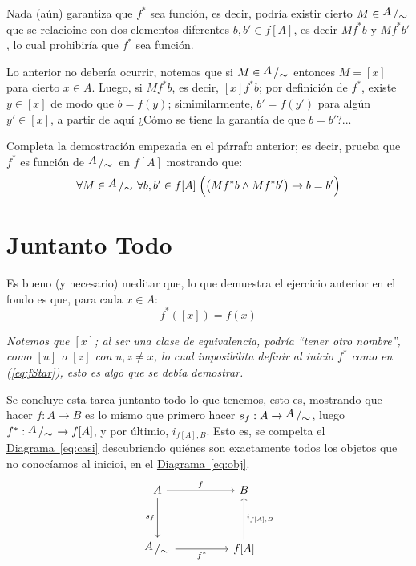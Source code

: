 \documentclass[letterpaper,DIV=14,headsepline,12pt]{scrartcl}
\newcommand{\pts}{}
\newenvironment{ejercicio}[1]{\ifthenelse{\equal{#1}{1} \OR \equal{#1}{+1}}{\renewcommand{\pts}{\textbf{(#1 pt)}}}{\renewcommand{\pts}{\textbf{(#1 pts)}}}\begin{ejj}\upshape \pts}{\end{ejj}}
\newcommand{\quot}[2]{{\raisebox{.2em}{$#1$}\left/\raisebox{-.2em}{$#2$}\right.}}
\begin{document}
    Nada (aún) garantiza que $f^*$ sea función, es decir, podría existir cierto $M \in \quot{A}{\sim}$ que se relacioine con dos elementos diferentes $b,b' \in f[A]$, es decir $M f^* b$ y $M f^* b'$, lo cual prohibiría que $f^*$ sea función.
    
    Lo anterior no debería ocurrir, notemos que si $M \in \quot{A}{\sim}$ entonces $M=[x]$ para cierto $x \in A$. Luego, si $M f^* b$, es decir, $[x] f^* b$; por definición de $f^*$, existe $y \in [x]$ de modo que $b=f(y)$; simimilarmente, $b'=f(y')$ para algún $y'\in[x]$, a partir de aquí ¿Cómo se tiene la garantía de que $b=b'$?...

    \begin{ejercicio}{1.5}\label{ej:fStar}
        Completa la demostración empezada en el párrafo anterior; es decir, prueba que $f^*$ es función de $\quot{A}{\sim}$ en $f[A]$ mostrando que:
        \[ \forall M \in \quot{A}{\sim} \; \forall b,b' \in f[A] \; \Big( \big( M f^* b \land M f^* b' \big) \to b=b' \Big) \]
    \end{ejercicio}

    \section*{Juntanto Todo}

    Es bueno (y necesario) meditar que, lo que demuestra el ejercicio anterior en el fondo es que, para cada $x \in A$:
    \begin{equation}\label{eq:fStar}
        f^*([x])=f(x)
    \end{equation}

    \textit{Notemos que $[x]$; al ser una clase de equivalencia, podría ``tener otro nombre'', como $[u]$ o $[z]$ con $u,z \neq x$, lo cual imposibilita definir al inicio $f^*$ como en (\ref{eq:fStar}), esto es algo que se debía demostrar.}

    Se concluye esta tarea juntanto todo lo que tenemos, esto es, mostrando que hacer $f:A\to B$ es lo mismo que primero hacer $s_f:A\to \quot{A}{\sim}$, luego $f^*:\quot{A}{\sim} \to f[A]$, y por últimio, $i_{f[A],B}$. Esto es, se compelta el \hyperref[eq:obj]{Diagrama~\ref*{eq:casi}} descubriendo quiénes son exactamente todos los objetos que no conocíamos al inicioi, en el \hyperref[eq:obj]{Diagrama~\ref*{eq:obj}}.
    \begin{equation}\label{eq:ya}
        \begin{tikzcd}
            A && B \\
            \\
            \quot{A}{\sim} && {f[A]}
            \arrow["f", from=1-1, to=1-3]
            \arrow["s_f"', from=1-1, to=3-1]
            \arrow["f^*"', from=3-1, to=3-3]
            \arrow["{i_{f[A],B}}"', from=3-3, to=1-3]
        \end{tikzcd}
    \end{equation}
\end{document}

